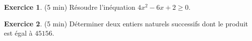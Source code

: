 \documentclass{exam}
\theoremstyle{definition}
\newtheorem{exercice}{Exercice}
\begin{document}
\large


% 
% 


\begin{exercice}{(5 min)}
    Résoudre l'inéquation $4x^2 -6x + 2 \geq 0$.%
\end{exercice}

\begin{exercice}{(5 min)}
    Déterminer deux entiers naturels successifs dont le produit est égal à $45156$.
\end{exercice}

\end{document}
